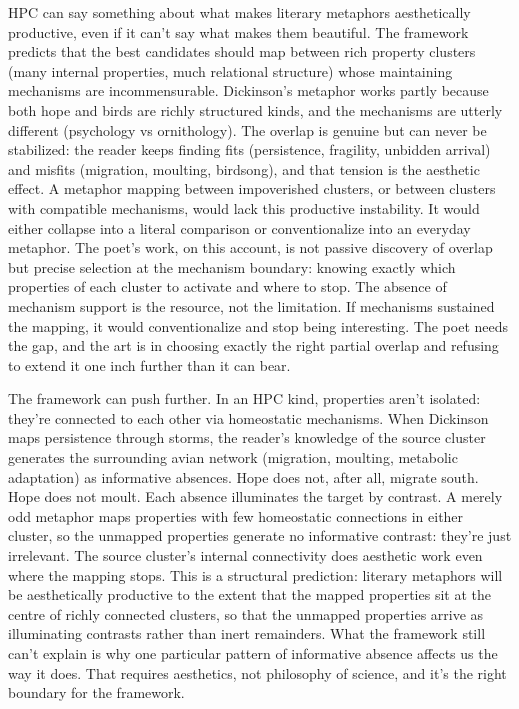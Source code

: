 \documentclass[12pt]{article}
\begin{document}
HPC can say something about what makes literary metaphors aesthetically productive, even if it can't say what makes them beautiful. The framework predicts that the best candidates should map between rich property clusters (many internal properties, much relational structure) whose maintaining mechanisms are incommensurable. Dickinson's metaphor works partly because both hope and birds are richly structured kinds, and the mechanisms are utterly different (psychology vs ornithology). The overlap is genuine but can never be stabilized: the reader keeps finding fits (persistence, fragility, unbidden arrival) and misfits (migration, moulting, birdsong), and that tension is the aesthetic effect. A metaphor mapping between impoverished clusters, or between clusters with compatible mechanisms, would lack this productive instability. It would either collapse into a literal comparison or conventionalize into an everyday metaphor. The poet's work, on this account, is not passive discovery of overlap but precise selection at the mechanism boundary: knowing exactly which properties of each cluster to activate and where to stop. The absence of mechanism support is the resource, not the limitation. If mechanisms sustained the mapping, it would conventionalize and stop being interesting. The poet needs the gap, and the art is in choosing exactly the right partial overlap and refusing to extend it one inch further than it can bear.

The framework can push further. In an HPC kind, properties aren't isolated: they're connected to each other via homeostatic mechanisms. When Dickinson maps persistence through storms, the reader's knowledge of the source cluster generates the surrounding avian network (migration, moulting, metabolic adaptation) as informative absences. Hope does not, after all, migrate south. Hope does not moult. Each absence illuminates the target by contrast. A merely odd metaphor maps properties with few homeostatic connections in either cluster, so the unmapped properties generate no informative contrast: they're just irrelevant. The source cluster's internal connectivity does aesthetic work even where the mapping stops. This is a structural prediction: literary metaphors will be aesthetically productive to the extent that the mapped properties sit at the centre of richly connected clusters, so that the unmapped properties arrive as illuminating contrasts rather than inert remainders. What the framework still can't explain is why one particular pattern of informative absence affects us the way it does. That requires aesthetics, not philosophy of science, and it's the right boundary for the framework.
\end{document}
